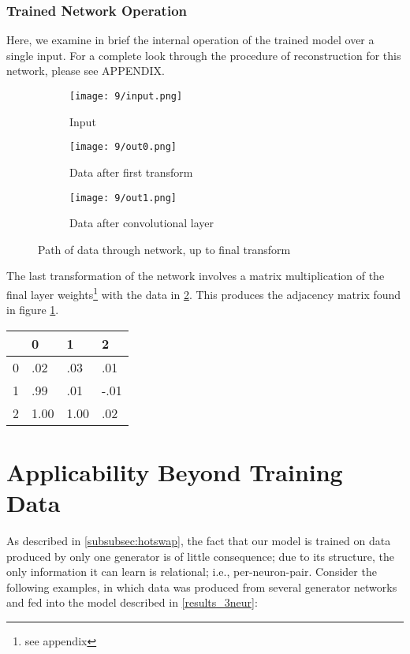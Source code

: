 \subsubsection{Trained Network Operation}
Here, we examine in brief the internal operation of the trained model over a 
single input. For a complete look through the procedure of reconstruction for 
this network, please see APPENDIX.
\begin{figure}[h]
	\centering
	\begin{subfigure}{.15\textwidth}
		\centering
		\texttt{[image: 9/input.png]}
		\caption{Input}
		\label{subfig:3neur_in}
	\end{subfigure}
	\hspace{1em}
	\begin{subfigure}{.3\textwidth}
		\texttt{[image: 9/out0.png]}
		\caption{Data after first transform}
	\end{subfigure}
	\hspace{1em}
	\begin{subfigure}{.3\textwidth}
		\texttt{[image: 9/out1.png]}
		\caption{Data after convolutional layer}
		\label{subfig:3neur_out1}
	\end{subfigure}
	\caption{Path of data through network, up to final transform}
	\label{fig:3neur_input}
\end{figure}

The last transformation of the network involves a matrix multiplication of the 
final layer weights\footnote{see appendix} with the data in 
\ref{subfig:3neur_out1}. This produces the adjacency matrix found in figure 
\ref{fig:3neur_pred}.

\begin{table}[h]
	\centering
	\begin{tabular}{l|lll}
		  & 0 	& 1   & 2\\
		\hline
		0 & .02 & .03 & .01\\
		1 & .99 & .01 & -.01\\
		2 & 1.00 & 1.00 & .02
	\end{tabular}
	\label{fig:3neur_pred}
\end{table}

\section{Applicability Beyond Training Data}
As described in \ref{subsubsec:hotswap}, the fact that our model is trained on 
data produced by only one generator is of little consequence; due to its 
structure, the only information it can learn is relational; i.e., 
per-neuron-pair. Consider the following examples, in which data was produced 
from several generator networks and fed into the model described in 
\ref{results_3neur}:



